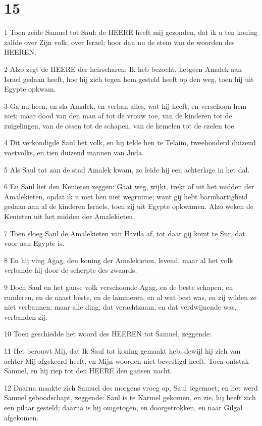\chapter{15}

\par 1 Toen zeide Samuel tot Saul: de HEERE heeft mij gezonden, dat ik u ten koning zalfde over Zijn volk, over Israel; hoor dan nu de stem van de woorden des HEEREN.
\par 2 Alzo zegt de HEERE der heirscharen: Ik heb bezocht, hetgeen Amalek aan Israel gedaan heeft, hoe hij zich tegen hem gesteld heeft op den weg, toen hij uit Egypte opkwam.
\par 3 Ga nu heen, en sla Amalek, en verban alles, wat hij heeft, en verschoon hem niet; maar dood van den man af tot de vrouw toe, van de kinderen tot de zuigelingen, van de ossen tot de schapen, van de kemelen tot de ezelen toe.
\par 4 Dit verkondigde Saul het volk, en hij telde hen te Telaim, tweehonderd duizend voetvolks, en tien duizend mannen van Juda.
\par 5 Als Saul tot aan de stad Amalek kwam, zo leide hij een achterlage in het dal.
\par 6 En Saul liet den Kenieten zeggen: Gaat weg, wijkt, trekt af uit het midden der Amalekieten, opdat ik u met hen niet wegruime; want gij hebt barmhartigheid gedaan aan al de kinderen Israels, toen zij uit Egypte opkwamen. Alzo weken de Kenieten uit het midden der Amalekieten.
\par 7 Toen sloeg Saul de Amalekieten van Havila af, tot daar gij komt te Sur, dat voor aan Egypte is.
\par 8 En hij ving Agag, den koning der Amalekieten, levend; maar al het volk verbande hij door de scherpte des zwaards.
\par 9 Doch Saul en het ganse volk verschoonde Agag, en de beste schapen, en runderen, en de naast beste, en de lammeren, en al wat best was, en zij wilden ze niet verbannen; maar alle ding, dat verachtzaam, en dat verdwijnende was, verbanden zij.
\par 10 Toen geschiedde het woord des HEEREN tot Samuel, zeggende:
\par 11 Het berouwt Mij, dat Ik Saul tot koning gemaakt heb, dewijl hij zich van achter Mij afgekeerd heeft, en Mijn woorden niet bevestigd heeft. Toen ontstak Samuel, en hij riep tot den HEERE den gansen nacht.
\par 12 Daarna maakte zich Samuel des morgens vroeg op, Saul tegemoet; en het werd Samuel geboodschapt, zeggende: Saul is te Karmel gekomen, en zie, hij heeft zich een pilaar gesteld; daarna is hij omgetogen, en doorgetrokken, en naar Gilgal afgekomen.
